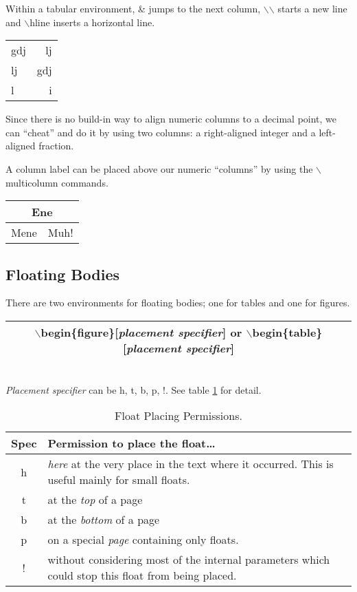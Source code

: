 \documentclass[11pt,a4paper]{article}
\begin{document}
Within a tabular environment, \& jumps to the next column, $\backslash$$\backslash$
starts a new line and $\backslash$hline inserts a horizontal line.\\
\begin{center}
    \begin{tabular}{@{} l @{...} r @{}}
        \hline
        gdj & lj \\
        lj & gdj \\
        l & i \\
        \hline
    \end{tabular}
\end{center}

Since there is no build-in way to align numeric columns to a decimal point, we
can ``cheat'' and do it by using two columns: a right-aligned integer and a left-
aligned fraction. 

A column label can be placed above our numeric ``columns'' by using 
the $\backslash$multicolumn commands.\\
\begin{center}
    \begin{tabular}{|c|c|}
        \hline
        \multicolumn{2}{|c|}{\textbf{Ene}}\\
        \hline
        Mene & Muh! \\
        \hline
    \end{tabular}
\end{center}
\subsection{Floating Bodies}
There are two environments for floating bodies; one for tables and one for figures.
\begin{table}[!h]
    \begin{tabular}{c}
        \hline
$\backslash$begin\{figure\}[\textit{placement specifier}] or
$\backslash$begin\{table\}[\textit{placement specifier}]\\
\hline
\end{tabular}
\end{table}\\
\textit{Placement specifier} can be h, t, b, p, !. See table \ref{t1} for detail.
\begin{table}[!h]
    \caption{Float Placing Permissions.}\label{t1}
    \begin{tabular}{c  p{10cm}}
        Spec & Permission to place the float\ldots\\
        \hline
        h    & \emph{here} at the very place in the text where it occurred. This is
        useful mainly for small floats.\\
        t    & at the \emph{top} of a page\\
        b    & at the \emph{bottom} of a page\\
        p    & on a special \emph{page} containing only floats.\\
        !    & without considering most of the internal parameters which could
        stop this float from being placed.\\
        \hline
    \end{tabular}
\end{table}
\end{document}
